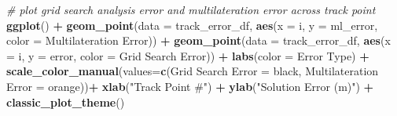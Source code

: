 \documentclass[
]{book}
\newenvironment{Shaded}{\begin{snugshade}}{\end{snugshade}}
\newcommand{\AttributeTok}[1]{\textcolor[rgb]{0.13,0.29,0.53}{#1}}
\newcommand{\CommentTok}[1]{\textcolor[rgb]{0.56,0.35,0.01}{\textit{#1}}}
\newcommand{\FunctionTok}[1]{\textcolor[rgb]{0.13,0.29,0.53}{\textbf{#1}}}
\newcommand{\NormalTok}[1]{#1}
\newcommand{\OtherTok}[1]{\textcolor[rgb]{0.56,0.35,0.01}{#1}}
\newcommand{\SpecialCharTok}[1]{\textcolor[rgb]{0.81,0.36,0.00}{\textbf{#1}}}
\newcommand{\StringTok}[1]{\textcolor[rgb]{0.31,0.60,0.02}{#1}}
\begin{document}
\begin{Shaded}
\begin{Highlighting}[]
\CommentTok{\# plot grid search analysis error and multilateration error across track point}
\FunctionTok{ggplot}\NormalTok{() }\SpecialCharTok{+}
  \FunctionTok{geom\_point}\NormalTok{(}\AttributeTok{data =}\NormalTok{ track\_error\_df,}
             \FunctionTok{aes}\NormalTok{(}\AttributeTok{x =}\NormalTok{ i,}
                 \AttributeTok{y =}\NormalTok{ ml\_error,}
                 \AttributeTok{color =} \StringTok{\textquotesingle{}Multilateration Error\textquotesingle{}}\NormalTok{)) }\SpecialCharTok{+}
  \FunctionTok{geom\_point}\NormalTok{(}\AttributeTok{data =}\NormalTok{ track\_error\_df,}
             \FunctionTok{aes}\NormalTok{(}\AttributeTok{x =}\NormalTok{ i,}
                 \AttributeTok{y =}\NormalTok{ error,}
                 \AttributeTok{color =} \StringTok{\textquotesingle{}Grid Search Error\textquotesingle{}}\NormalTok{)) }\SpecialCharTok{+}
  \FunctionTok{labs}\NormalTok{(}\AttributeTok{color =} \StringTok{\textquotesingle{}Error Type\textquotesingle{}}\NormalTok{) }\SpecialCharTok{+}
  \FunctionTok{scale\_color\_manual}\NormalTok{(}\AttributeTok{values=}\FunctionTok{c}\NormalTok{(}\StringTok{\textquotesingle{}Grid Search Error\textquotesingle{}} \OtherTok{=} \StringTok{\textquotesingle{}black\textquotesingle{}}\NormalTok{,}
                              \StringTok{\textquotesingle{}Multilateration Error\textquotesingle{}} \OtherTok{=} \StringTok{\textquotesingle{}orange\textquotesingle{}}\NormalTok{))}\SpecialCharTok{+}
  \FunctionTok{xlab}\NormalTok{(}\StringTok{"Track Point \#"}\NormalTok{) }\SpecialCharTok{+}
  \FunctionTok{ylab}\NormalTok{(}\StringTok{"Solution Error (m)"}\NormalTok{) }\SpecialCharTok{+}
  \FunctionTok{classic\_plot\_theme}\NormalTok{()}


\end{Highlighting}
\end{Shaded}
\end{document}
